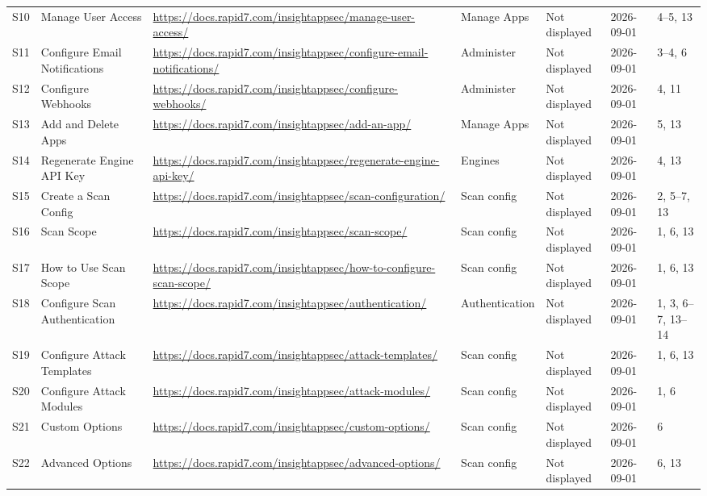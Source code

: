 \documentclass[11pt,letterpaper,oneside]{scrreprt}
\begin{document}
\begin{landscape}
\begin{longtable}{@{}P{0.34in}P{1.40in}P{3.00in}P{0.95in}P{0.75in}P{0.72in}P{1.55in}@{}}
\label{src:S10}S10 & Manage User Access & \url{https://docs.rapid7.com/insightappsec/manage-user-access/} & Manage Apps & Not displayed & 2026-09-01 & 4--5, 13\\
\label{src:S11}S11 & Configure Email Notifications & \url{https://docs.rapid7.com/insightappsec/configure-email-notifications/} & Administer & Not displayed & 2026-09-01 & 3--4, 6\\
\label{src:S12}S12 & Configure Webhooks & \url{https://docs.rapid7.com/insightappsec/configure-webhooks/} & Administer & Not displayed & 2026-09-01 & 4, 11\\
\label{src:S13}S13 & Add and Delete Apps & \url{https://docs.rapid7.com/insightappsec/add-an-app/} & Manage Apps & Not displayed & 2026-09-01 & 5, 13\\
\label{src:S14}S14 & Regenerate Engine API Key & \url{https://docs.rapid7.com/insightappsec/regenerate-engine-api-key/} & Engines & Not displayed & 2026-09-01 & 4, 13\\
\label{src:S15}S15 & Create a Scan Config & \url{https://docs.rapid7.com/insightappsec/scan-configuration/} & Scan config & Not displayed & 2026-09-01 & 2, 5--7, 13\\
\label{src:S16}S16 & Scan Scope & \url{https://docs.rapid7.com/insightappsec/scan-scope/} & Scan config & Not displayed & 2026-09-01 & 1, 6, 13\\
\label{src:S17}S17 & How to Use Scan Scope & \url{https://docs.rapid7.com/insightappsec/how-to-configure-scan-scope/} & Scan config & Not displayed & 2026-09-01 & 1, 6, 13\\
\label{src:S18}S18 & Configure Scan Authentication & \url{https://docs.rapid7.com/insightappsec/authentication/} & Authentication & Not displayed & 2026-09-01 & 1, 3, 6--7, 13--14\\
\label{src:S19}S19 & Configure Attack Templates & \url{https://docs.rapid7.com/insightappsec/attack-templates/} & Scan config & Not displayed & 2026-09-01 & 1, 6, 13\\
\label{src:S20}S20 & Configure Attack Modules & \url{https://docs.rapid7.com/insightappsec/attack-modules/} & Scan config & Not displayed & 2026-09-01 & 1, 6\\
\label{src:S21}S21 & Custom Options & \url{https://docs.rapid7.com/insightappsec/custom-options/} & Scan config & Not displayed & 2026-09-01 & 6\\
\label{src:S22}S22 & Advanced Options & \url{https://docs.rapid7.com/insightappsec/advanced-options/} & Scan config & Not displayed & 2026-09-01 & 6, 13\\

\end{longtable}
\end{landscape}
\end{document}
